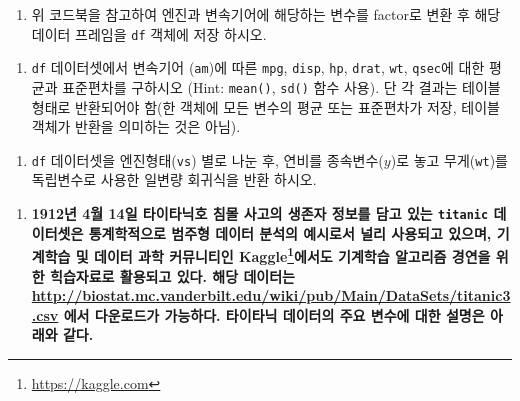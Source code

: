 \documentclass[
  11pt,
]{krantz}
\providecommand{\tightlist}{%
  \setlength{\itemsep}{0pt}\setlength{\parskip}{0pt}}
\renewcommand{\href}[2]{#2\footnote{\url{#1}}}
\begin{document}
\begin{enumerate}
\def\labelenumi{\alph{enumi})}
\setcounter{enumi}{1}
\tightlist
\item
  위 코드북을 참고하여 엔진과 변속기어에 해당하는 변수를 factor로 변환 후 해당 데이터 프레임을 \texttt{df} 객체에 저장 하시오.
\end{enumerate}

\begin{enumerate}
\def\labelenumi{\alph{enumi})}
\setcounter{enumi}{2}
\tightlist
\item
  \texttt{df} 데이터셋에서 변속기어 (\texttt{am})에 따른 \texttt{mpg}, \texttt{disp}, \texttt{hp}, \texttt{drat}, \texttt{wt}, \texttt{qsec}에 대한 평균과 표준편차를 구하시오 (Hint: \texttt{mean()}, \texttt{sd()} 함수 사용). 단 각 결과는 테이블 형태로 반환되어야 함(한 객체에 모든 변수의 평균 또는 표준편차가 저장, 테이블 객체가 반환을 의미하는 것은 아님).
\end{enumerate}

\begin{enumerate}
\def\labelenumi{\alph{enumi})}
\setcounter{enumi}{3}
\tightlist
\item
  \texttt{df} 데이터셋을 엔진형태(\texttt{vs}) 별로 나눈 후, 연비를 종속변수(\(y\))로 놓고 무게(\texttt{wt})를 독립변수로 사용한 일변량 회귀식을 반환 하시오.
\end{enumerate}

\begin{enumerate}
\def\labelenumi{\arabic{enumi}.}
\setcounter{enumi}{2}
\tightlist
\item
  \textbf{1912년 4월 14일 타이타닉호 침몰 사고의 생존자 정보를 담고 있는 \texttt{titanic} 데이터셋은 통계학적으로 범주형 데이터 분석의 예시로서 널리 사용되고 있으며, 기계학습 및 데이터 과학 커뮤니티인 \href{https://kaggle.com}{Kaggle}에서도 기계학습 알고리즘 경연을 위한 힉습자료로 활용되고 있다. 해당 데이터는 \url{http://biostat.mc.vanderbilt.edu/wiki/pub/Main/DataSets/titanic3.csv} 에서 다운로드가 가능하다. 타이타닉 데이터의 주요 변수에 대한 설명은 아래와 같다.}
\end{enumerate}

\footnotesize
\end{document}

